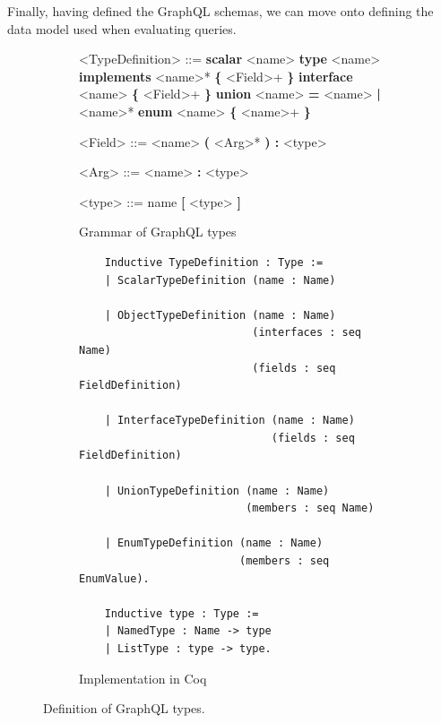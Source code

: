 Finally, having defined the GraphQL schemas, we can move onto defining the data model used when evaluating queries.

\setlength{\grammarparsep}{20pt plus 1pt minus 1pt} %
\begin{figure}
    \centering
    \begin{subfigure}{.5\textwidth}
    \begin{grammar}
    <TypeDefinition> ::= \textbf{scalar} <name>
    \alt \textbf{type} <name> \textbf{implements} <name>* \textbf{\{} <Field>+ \textbf{\}}
    \alt \textbf{interface} <name> \textbf{\{} <Field>+ \textbf{\}}
    \alt \textbf{union} <name> \textbf{=} <name> \textbf{|} <name>*
    \alt \textbf{enum} <name> \textbf{\{} <name>+ \textbf{\}}

    <Field> ::= <name> \textbf{(} <Arg>* \textbf{) :} <type>

    <Arg> ::= <name> \textbf{:} <type>

    <type> ::= name
    \alt \textbf{[}  <type> \textbf{]}
    \end{grammar}

    \caption{Grammar of GraphQL types}
    \end{subfigure}%
    \begin{subfigure}{.5\textwidth}
    \begin{verbatim}
    Inductive TypeDefinition : Type :=
    | ScalarTypeDefinition (name : Name)

    | ObjectTypeDefinition (name : Name)
                           (interfaces : seq Name)
                           (fields : seq FieldDefinition)

    | InterfaceTypeDefinition (name : Name)
                              (fields : seq FieldDefinition)

    | UnionTypeDefinition (name : Name)
                          (members : seq Name)

    | EnumTypeDefinition (name : Name)
                         (members : seq EnumValue).

    Inductive type : Type :=
    | NamedType : Name -> type
    | ListType : type -> type.
    \end{verbatim}

    \caption{Implementation in Coq}
    \end{subfigure}
    \caption{Definition of GraphQL types.}
    \label{fig:types_def}
\end{figure}



